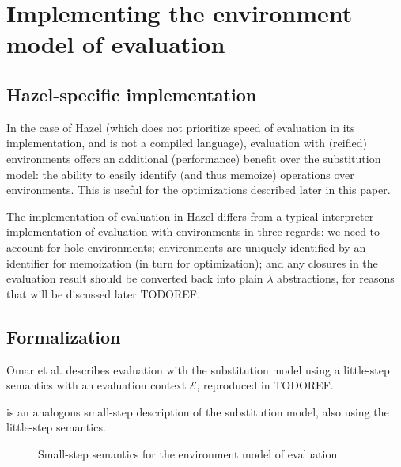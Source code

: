 \section{Implementing the environment model of evaluation}
\label{sec:env_model_evaluation}

\subsection{Hazel-specific implementation}
\label{sec:eval_with_envs}

In the case of Hazel (which does not prioritize speed of evaluation in its implementation, and is not a compiled language), evaluation with (reified) environments offers an additional (performance) benefit over the substitution model: the ability to easily identify (and thus memoize) operations over environments. This is useful for the optimizations described later in this paper.

The implementation of evaluation in Hazel differs from a typical interpreter implementation of evaluation with environments in three regards: we need to account for hole environments; environments are uniquely identified by an identifier for memoization (in turn for optimization); and any closures in the evaluation result should be converted back into plain $\lambda$ abstractions, for reasons that will be discussed later TODOREF.


\subsection{Formalization}
\label{sec:formalization}

Omar et al. \cite{conf/popl/HazelnutLive19} describes evaluation with the substitution model using a little-step semantics with an evaluation context $\mathcal{E}$, reproduced in TODOREF.


 is an analogous small-step description of the substitution model, also using the little-step semantics.

\begin{figure}
  \centering
  \begin{mdframed}
    \begin{singlespace}
      
    \end{singlespace}
  \end{mdframed}
  \caption{Small-step semantics for the environment model of evaluation}
  \label{fig:small-step-formal}
\end{figure}

